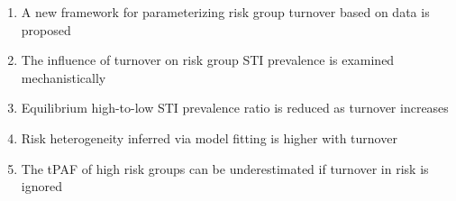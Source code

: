 \begin{enumerate}
  \item A new framework for parameterizing risk group turnover based on data is proposed
  \item The influence of turnover on risk group STI prevalence is examined mechanistically
  \item Equilibrium high-to-low STI prevalence ratio is reduced as turnover increases
  \item Risk heterogeneity inferred via model fitting is higher with turnover
  \item The tPAF of high risk groups can be underestimated if turnover in risk is ignored
\end{enumerate}